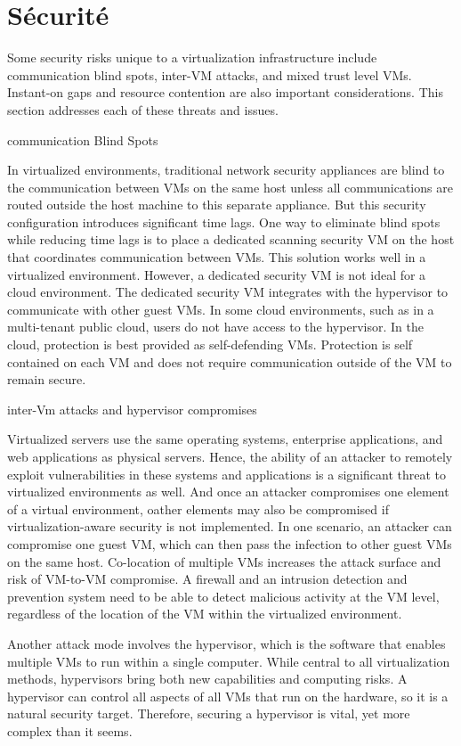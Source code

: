 \section{Sécurité}

Some security risks unique to a virtualization infrastructure include communication blind spots, inter-VM attacks, and mixed trust level VMs. Instant-on gaps and resource contention are also important considerations. This section addresses each of these threats and issues.

communication Blind Spots

In virtualized environments, traditional network security appliances are blind to the communication between VMs on the same host unless all communications are routed outside the host machine to this separate appliance. But this security configuration introduces significant time lags. One way to eliminate blind spots while reducing time lags is to place a dedicated scanning security VM on the host that coordinates communication between VMs. This solution works well in a virtualized environment. However, a dedicated security VM is not ideal for a cloud environment. The dedicated security VM integrates with the hypervisor to communicate with other guest VMs. In some cloud environments, such as in a multi-tenant public cloud, users do not have access to the hypervisor. In the cloud, protection is best provided as self-defending VMs. Protection is self contained on each VM and does not require communication outside of the VM to remain secure.

inter-Vm attacks and hypervisor compromises

Virtualized servers use the same operating systems, enterprise applications, and web applications as physical servers. Hence, the ability of an attacker to remotely exploit vulnerabilities in these systems and applications is a significant threat to virtualized environments as well. And once an attacker compromises one element of a virtual environment, oather elements may also be compromised if virtualization-aware security is not implemented.
In one scenario, an attacker can compromise one guest VM, which can then pass
the infection to other guest VMs on the same host. Co-location of multiple VMs
increases the attack surface and risk of VM-to-VM compromise. A firewall and an intrusion detection and prevention system need to be able to detect malicious activity at the VM level, regardless of the location of the VM within the virtualized environment.

Another attack mode involves the hypervisor, which is the software that enables multiple VMs to run within a single computer. While central to all virtualization methods, hypervisors bring both new capabilities and computing risks. A hypervisor can control all aspects of all VMs that run on the hardware, so it is a natural security target. Therefore, securing a hypervisor is vital, yet more complex than it seems.

